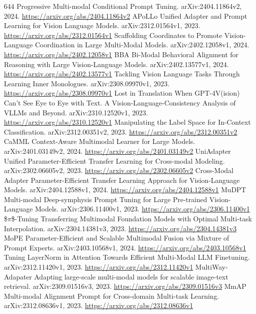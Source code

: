 \documentclass[11pt]{article}
\begin{document}
\begin{thebibliography}{644}
 Progressive Multi-modal Conditional Prompt Tuning. arXiv:2404.11864v2, 2024. \url{https://arxiv.org/abs/2404.11864v2}
 APoLLo Unified Adapter and Prompt Learning for Vision Language Models. arXiv:2312.01564v1, 2023. \url{https://arxiv.org/abs/2312.01564v1}
 Scaffolding Coordinates to Promote Vision-Language Coordination in Large Multi-Modal Models. arXiv:2402.12058v1, 2024. \url{https://arxiv.org/abs/2402.12058v1}
 BBA Bi-Modal Behavioral Alignment for Reasoning with Large Vision-Language Models. arXiv:2402.13577v1, 2024. \url{https://arxiv.org/abs/2402.13577v1}
 Tackling Vision Language Tasks Through Learning Inner Monologues. arXiv:2308.09970v1, 2023. \url{https://arxiv.org/abs/2308.09970v1}
 Lost in Translation When GPT-4V(ision) Can't See Eye to Eye with Text. A Vision-Language-Consistency Analysis of VLLMs and Beyond. arXiv:2310.12520v1, 2023. \url{https://arxiv.org/abs/2310.12520v1}
 Manipulating the Label Space for In-Context Classification. arXiv:2312.00351v2, 2023. \url{https://arxiv.org/abs/2312.00351v2}
 CaMML Context-Aware Multimodal Learner for Large Models. arXiv:2401.03149v2, 2024. \url{https://arxiv.org/abs/2401.03149v2}
 UniAdapter Unified Parameter-Efficient Transfer Learning for Cross-modal Modeling. arXiv:2302.06605v2, 2023. \url{https://arxiv.org/abs/2302.06605v2}
 Cross-Modal Adapter Parameter-Efficient Transfer Learning Approach for Vision-Language Models. arXiv:2404.12588v1, 2024. \url{https://arxiv.org/abs/2404.12588v1}
 MuDPT Multi-modal Deep-symphysis Prompt Tuning for Large Pre-trained Vision-Language Models. arXiv:2306.11400v1, 2023. \url{https://arxiv.org/abs/2306.11400v1}
 \$$\pi$\$-Tuning Transferring Multimodal Foundation Models with Optimal Multi-task Interpolation. arXiv:2304.14381v3, 2023. \url{https://arxiv.org/abs/2304.14381v3}
 MoPE Parameter-Efficient and Scalable Multimodal Fusion via Mixture of Prompt Experts. arXiv:2403.10568v1, 2024. \url{https://arxiv.org/abs/2403.10568v1}
 Tuning LayerNorm in Attention Towards Efficient Multi-Modal LLM Finetuning. arXiv:2312.11420v1, 2023. \url{https://arxiv.org/abs/2312.11420v1}
 MultiWay-Adapater Adapting large-scale multi-modal models for scalable image-text retrieval. arXiv:2309.01516v3, 2023. \url{https://arxiv.org/abs/2309.01516v3}
 MmAP Multi-modal Alignment Prompt for Cross-domain Multi-task Learning. arXiv:2312.08636v1, 2023. \url{https://arxiv.org/abs/2312.08636v1}

\end{thebibliography}
\end{document}
